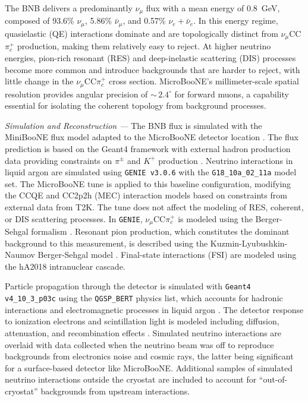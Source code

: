 \documentclass[aps,prl,reprint,superscriptaddress,nofootinbib, showpacs]{revtex4-2}
\begin{document}
The BNB delivers a predominantly $\nu_{\mu}$ flux with a mean energy of 0.8~GeV, composed of 93.6\%  $\nu_{\mu}$, 5.86\% $\bar{\nu}_{\mu}$, and 0.57\% $\nu_e + \bar{\nu}_e$. In this energy regime, quasielastic (QE) interactions dominate and are topologically distinct from $\nu_\mu$CC$\pi^+_c$ production, making them relatively easy to reject. At higher neutrino energies, pion-rich resonant (RES) and deep-inelastic scattering (DIS) processes become more common and introduce backgrounds that are harder to reject, with little change in the $\nu_\mu$CC$\pi^+_c$ cross section. MicroBooNE’s millimeter-scale spatial resolution provides angular precision of $\sim$\,$2.4^{\circ}$ for forward muons, a capability essential for isolating the coherent topology from background processes.

\textit{Simulation and Reconstruction ---} The BNB flux is simulated with the MiniBooNE flux model adapted to the MicroBooNE detector location \cite{MiniBooNE_Flux}. The flux prediction is based on the Geant4 framework with external hadron production data providing constraints on $\pi^{\pm}$ and $K^{+}$ production \cite{HARP2007,SciBooNE2011}. Neutrino interactions in liquid argon are simulated using \texttt{GENIE v3.0.6} \cite{GENIE2010}
with the \texttt{G18\_10a\_02\_11a} model set. The MicroBooNE tune \cite{MicroBooNE_Tune} is applied to this baseline configuration, modifying the CCQE and CC2p2h (MEC) interaction models based on constraints from external data from T2K. The tune does not affect the modeling of RES, coherent, or DIS scattering processes. In \texttt{GENIE}, $\nu_\mu$CC$\pi^+_c$ is modeled using the Berger-Sehgal formalism \cite{BergerSehgal_2009}. Resonant pion production, which constitutes the dominant background to this measurement, is described using the Kuzmin-Lyubushkin-Naumov Berger-Sehgal model \cite{10.1063/1.3274164, doi:10.1142/S0217732304016172, ReinSehgal_Update, PhysRevD.77.053001}. Final-state interactions (FSI) are modeled using the hA2018 intranuclear cascade.

Particle propagation through the detector is simulated with \texttt{Geant4 v4\_10\_3\_p03c} using the \texttt{QGSP\_BERT} physics list, which accounts for hadronic interactions and electromagnetic processes in liquid argon \cite{Agostinelli2003, Allison2006, Allison2016}. The detector response to ionization electrons and scintillation light is modeled including diffusion, attenuation, and recombination effects \cite{Adams2018_SP1, Adams2018_SP2}. Simulated neutrino interactions are overlaid with data collected when the neutrino beam was off to reproduce backgrounds from electronics noise and cosmic rays, the latter being significant for a surface-based detector like MicroBooNE. Additional samples of simulated neutrino interactions outside the cryostat are included to account for “out-of-cryostat” backgrounds from upstream interactions. 
\end{document}

